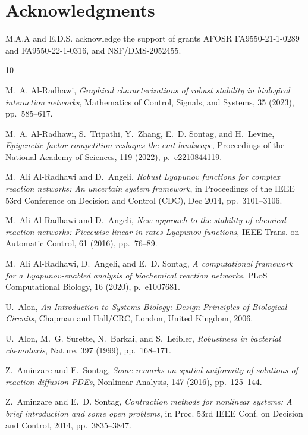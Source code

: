 \documentclass[onefignum,onetabnum]{siamonline220329}
\begin{document}
{\section*{Acknowledgments}
M.A.A and E.D.S. {acknowledge} the support of grants AFOSR FA9550-21-1-0289 and FA9550-22-1-0316, and NSF/DMS-2052455.

\begin{thebibliography}{10}
	
	{\sc M.~A. Al-Radhawi}, {\em Graphical characterizations of robust stability in
		biological interaction networks}, Mathematics of Control, Signals, and
	Systems, 35 (2023), pp.~585--617.
	
	{\sc M.~A. Al-Radhawi, S.~Tripathi, Y.~Zhang, E.~D. Sontag, and H.~Levine},
	{\em Epigenetic factor competition reshapes the emt landscape}, Proceedings
	of the National Academy of Sciences, 119 (2022), p.~e2210844119.
	
	{\sc M.~Ali Al-Radhawi and D.~Angeli}, {\em Robust {L}yapunov functions for
		complex reaction networks: An uncertain system framework}, in Proceedings of
	the IEEE 53rd Conference on Decision and Control (CDC), Dec 2014,
	pp.~3101--3106.
	
	{\sc M.~Ali Al-Radhawi and D.~Angeli}, {\em New approach to the stability of
		chemical reaction networks: Piecewise linear in rates {L}yapunov functions},
	IEEE Trans. on Automatic Control, 61 (2016), pp.~76--89.
	
	{\sc M.~Ali Al-Radhawi, D.~Angeli, and E.~D. Sontag}, {\em A computational
		framework for a {L}yapunov-enabled analysis of biochemical reaction
		networks}, PLoS Computational Biology, 16 (2020), p.~e1007681.
	
	{\sc U.~Alon}, {\em An Introduction to Systems Biology: Design Principles of
		Biological Circuits}, Chapman and Hall/CRC, London, United Kingdom, 2006.
	
	{\sc U.~Alon, M.~G. Surette, N.~Barkai, and S.~Leibler}, {\em Robustness in
		bacterial chemotaxis}, Nature, 397 (1999), pp.~168--171.
	
	{\sc Z.~Aminzare and E.~Sontag}, {\em Some remarks on spatial uniformity of
		solutions of reaction-diffusion {PDE}s}, Nonlinear Analysis, 147 (2016),
	pp.~125--144.
	
	{\sc Z.~Aminzare and E.~D. Sontag}, {\em Contraction methods for nonlinear
		systems: A brief introduction and some open problems}, in Proc. 53rd IEEE
	Conf. on Decision and Control, 2014, pp.~3835--3847.
	

\end{thebibliography}}
\end{document}
